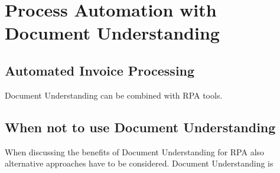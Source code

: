 \section{Process Automation with Document Understanding}
\subsection{Automated Invoice Processing}
Document Understanding can be combined with \ac{RPA} tools.
\subsection{When not to use Document Understanding}
When discussing the benefits of Document Understanding for \ac{RPA} also alternative approaches have to be considered. Document Understanding is 

\cite{alt2002integrierte,au2001should}